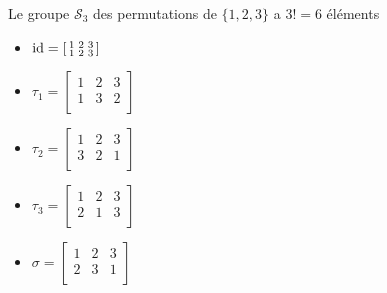\begin{frame}
\medskip 
Le groupe $\mathcal{S}_3$ des permutations de $\{1,2,3\}$ a $3!=6$ éléments

\pause

\begin{minipage}{0.39\textwidth}
\begin{itemize}
 \item $\mathop{\text{id}}\nolimits = \left[\begin{smallmatrix} 
 1 & 2 & 3 \\  
 1 & 2 & 3 \\     
        \end{smallmatrix} \right]
$
\pause

 \item $\tau_1 = \left[\begin{smallmatrix} 
 1 & 2 & 3 \\  
 1 & 3 & 2 \\     
        \end{smallmatrix} \right]
$ 
\pause

 \item $\tau_2 = \left[\begin{smallmatrix} 
 1 & 2 & 3 \\  
 3 & 2 & 1 \\     
        \end{smallmatrix} \right]
$ 
\pause

 \item $\tau_3 = \left[\begin{smallmatrix} 
 1 & 2 & 3 \\  
 2 & 1 & 3 \\     
        \end{smallmatrix} \right]
$
\pause

 \item $\sigma = \left[\begin{smallmatrix} 
 1 & 2 & 3 \\  
 2 & 3 & 1 \\     
        \end{smallmatrix} \right]
$
\pause



\end{itemize}
\end{minipage}
\end{frame}
